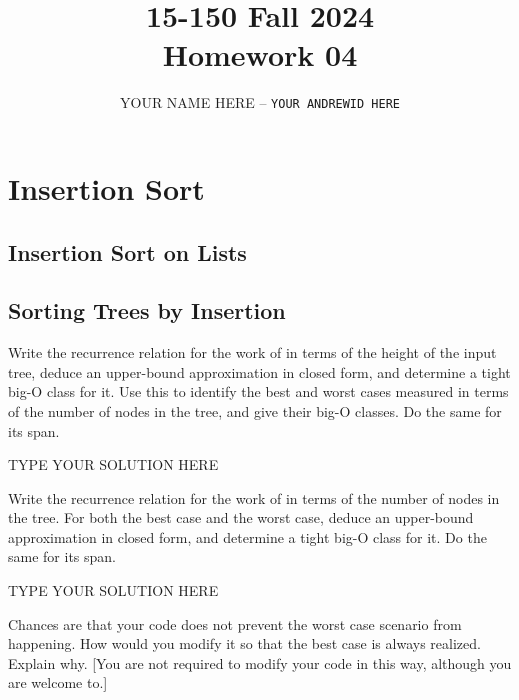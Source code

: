\documentclass[11pt]{article}
\title{\textbf{15-150 Fall 2024\\Homework 04}}
\author{YOUR NAME HERE -- \texttt{YOUR ANDREWID HERE}}
\newcommand{\declarecommand}[1]{\providecommand{#1}{}\renewcommand{#1}}
\begin{document}
\maketitle

\section{Insertion Sort}

\subsection{Insertion Sort on Lists}

\subsection{Sorting Trees by Insertion}

\begin{task}{6} %
Write the recurrence relation for the work of  in terms of the
height of the input tree, deduce an upper-bound approximation in closed form,
and determine a tight big-O class for it.  Use this to identify the best and
worst cases measured in terms of the number of nodes in the tree, and give
their big-O classes.  Do the same for its span.
\end{task}

\begin{solution}
TYPE YOUR SOLUTION HERE
\end{solution}


\declarecommand{\Wa}{W_{\smle{Insert}}}
\declarecommand{\Sa}{S_{\smle{Insert}}}
\addtocounter{taskNum}{1}
\begin{task}{10} %
Write the recurrence relation for the work of  in terms of the
number of nodes in the tree.  For both the best case and the worst case,
deduce an upper-bound approximation in closed form, and determine a tight
big-O class for it.  Do the same for its span.
\end{task}

\begin{solution}
TYPE YOUR SOLUTION HERE
\end{solution}


\declarecommand{\Wa}{W_{\smle{Insert}}}
\declarecommand{\Wb}{W_{\smle{InsList}}}
\declarecommand{\Wc}{W_{\smle{ILsort}}}
\declarecommand{\Wd}{W_{\smle{inorder}}}
\declarecommand{\Sa}{S_{\smle{Insert}}}
\declarecommand{\Sb}{S_{\smle{InsList}}}
\declarecommand{\Sc}{S_{\smle{ILsort}}}
\declarecommand{\Sd}{S_{\smle{inorder}}}
\begin{task}{2} %
Chances are that your code does not prevent the worst case scenario from
happening.  How would you modify it so that the best case is always realized.
Explain why.  [You are not required to modify your code in this way, although
you are welcome to.]
\end{task}
\end{document}
